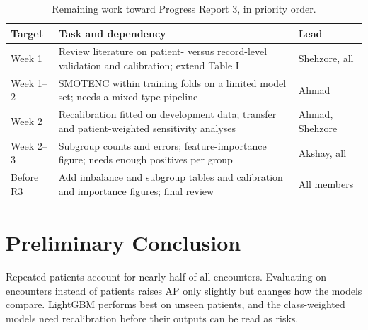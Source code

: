 \documentclass[conference]{IEEEtran}
\begin{document}
\begin{table}[t]\caption{Remaining work toward Progress Report 3, in priority order.}\label{tab:plan}\centering\footnotesize
\begin{tabular}{p{1.05cm}p{4.2cm}p{2.15cm}}\toprule
Target & Task and dependency & Lead\\\midrule
Week 1 & Review literature on patient- versus record-level validation and calibration; extend Table I & Shehzore, all\\
Week 1--2 & SMOTENC within training folds on a limited model set; needs a mixed-type pipeline & Ahmad\\
Week 2 & Recalibration fitted on development data; transfer and patient-weighted sensitivity analyses & Ahmad, Shehzore\\
Week 2--3 & Subgroup counts and errors; feature-importance figure; needs enough positives per group & Akshay, all\\
Before R3 & Add imbalance and subgroup tables and calibration and importance figures; final review & All members\\\bottomrule
\end{tabular}\end{table}

\section{Preliminary Conclusion}
Repeated patients account for nearly half of all encounters. Evaluating on encounters instead of patients raises AP only slightly but changes how the models compare. LightGBM performs best on unseen patients, and the class-weighted models need recalibration before their outputs can be read as risks.



\end{document}
